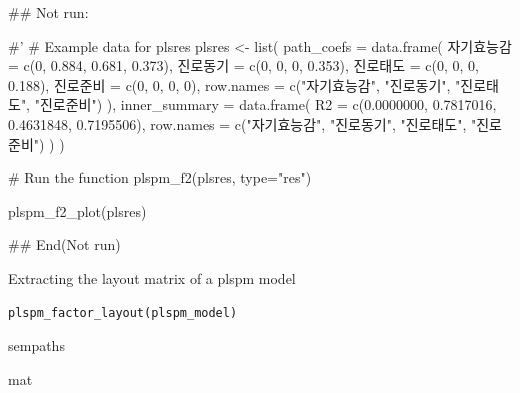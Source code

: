 \documentclass[a4paper]{book}
\begin{document}
\begin{Examples}
\begin{ExampleCode}
\#\# Not run: 

#'
# Example data for plsres
plsres <- list(
  path_coefs = data.frame(
    자기효능감 = c(0, 0.884, 0.681, 0.373),
    진로동기 = c(0, 0, 0, 0.353),
    진로태도 = c(0, 0, 0, 0.188),
    진로준비 = c(0, 0, 0, 0),
    row.names = c("자기효능감", "진로동기", "진로태도", "진로준비")
  ),
  inner_summary = data.frame(
    R2 = c(0.0000000, 0.7817016, 0.4631848, 0.7195506),
    row.names = c("자기효능감", "진로동기", "진로태도", "진로준비")
  )
)

# Run the function
plspm_f2(plsres, type="res")



plspm_f2_plot(plsres)

## End(Not run)


\end{ExampleCode}
\end{Examples}
%
\begin{Description}
Extracting the layout matrix of a plspm model
\end{Description}
%
\begin{Usage}
\begin{verbatim}
plspm_factor_layout(plspm_model)
\end{verbatim}
\end{Usage}
%
\begin{Arguments}
\begin{ldescription}
\item[\code{plspm\_model}] sempaths
\end{ldescription}
\end{Arguments}
%
\begin{Value}
mat
\end{Value}
%
\end{document}
